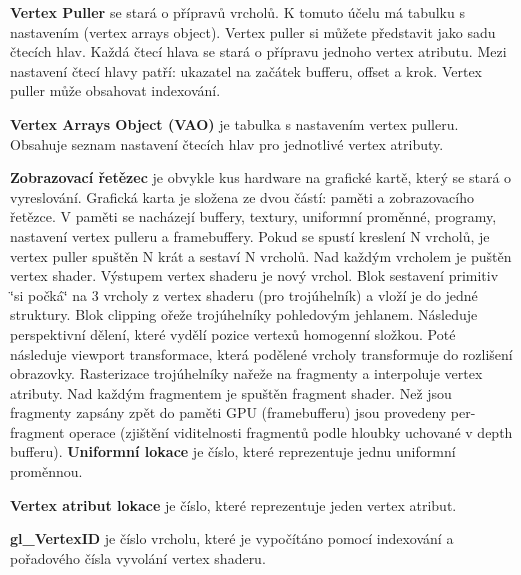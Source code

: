 {\bfseries Vertex Puller} se stará o přípravů vrcholů. K tomuto účelu má tabulku s nastavením (vertex arrays object). Vertex puller si můžete představit jako sadu čtecích hlav. Každá čtecí hlava se stará o přípravu jednoho vertex atributu. Mezi nastavení čtecí hlavy patří\+: ukazatel na začátek bufferu, offset a krok. Vertex puller může obsahovat indexování.

{\bfseries Vertex Arrays Object (V\+A\+O)} je tabulka s nastavením vertex pulleru. Obsahuje seznam nastavení čtecích hlav pro jednotlivé vertex atributy.

{\bfseries Zobrazovací řetězec} je obvykle kus hardware na grafické kartě, který se stará o vyreslování. Grafická karta je složena ze dvou částí\+: paměti a zobrazovacího řetězce. V paměti se nacházejí buffery, textury, uniformní proměnné, programy, nastavení vertex pulleru a framebuffery. Pokud se spustí kreslení N vrcholů, je vertex puller spuštěn N krát a sestaví N vrcholů. Nad každým vrcholem je puštěn vertex shader. Výstupem vertex shaderu je nový vrchol. Blok sestavení primitiv \char`\"{}si počká\char`\"{} na 3 vrcholy z vertex shaderu (pro trojúhelník) a vloží je do jedné struktury. Blok clipping ořeže trojúhelníky pohledovým jehlanem. Následuje perspektivní dělení, které vydělí pozice vertexů homogenní složkou. Poté následuje viewport transformace, která podělené vrcholy transformuje do rozlišení obrazovky. Rasterizace trojúhelníky nařeže na fragmenty a interpoluje vertex atributy. Nad každým fragmentem je spuštěn fragment shader. Než jsou fragmenty zapsány zpět do paměti G\+P\+U (framebufferu) jsou provedeny per-\/fragment operace (zjištění viditelnosti fragmentů podle hloubky uchované v depth bufferu).  {\bfseries Uniformní lokace} je číslo, které reprezentuje jednu uniformní proměnnou.

{\bfseries Vertex atribut lokace} je číslo, které reprezentuje jeden vertex atribut.

{\bfseries gl\+\_\+\+Vertex\+I\+D} je číslo vrcholu, které je vypočítáno pomocí indexování a pořadového čísla vyvolání vertex shaderu.

